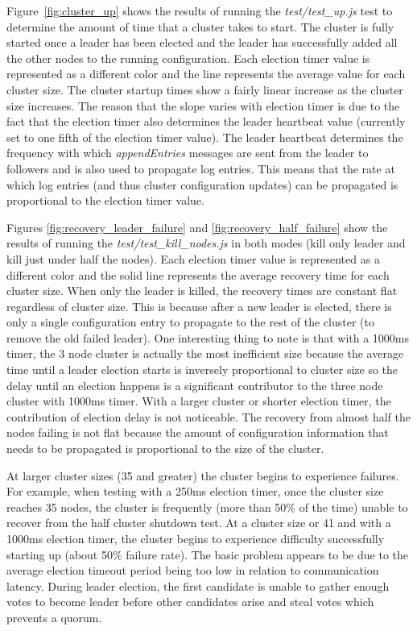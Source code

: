 \documentclass[conference,compsoc]{./IEEEtran/IEEEtran}
\begin{document}
Figure~\ref{fig:cluster_up} shows the results of running the
\emph{test/test\_up.js} test to determine the amount of time that
a cluster takes to start. The cluster is fully started once a leader
has been elected and the leader has successfully added all the other
nodes to the running configuration. Each election timer value is
represented as a different color and the line represents the average
value for each cluster size. The cluster startup times show a fairly
linear increase as the cluster size increases. The reason that the
slope varies with election timer is due to the fact that the election
timer also determines the leader heartbeat value (currently set to one
fifth of the election timer value). The leader heartbeat determines
the frequency with which \emph{appendEntries} messages are sent from
the leader to followers and is also used to propagate log entries.
This means that the rate at which log entries (and thus cluster
configuration updates) can be propagated is proportional to the
election timer value.

Figures \ref{fig:recovery_leader_failure} and
\ref{fig:recovery_half_failure} show the results of running the
\emph{test/test\_kill\_nodes.js} in both modes (kill only leader and
kill just under half the nodes). Each election timer value is
represented as a different color and the solid line represents the
average recovery time for each cluster size. When only the leader is
killed, the recovery times are constant flat regardless of cluster
size. This is because after a new leader is elected, there is only
a single configuration entry to propagate to the rest of the cluster
(to remove the old failed leader). One interesting thing to note is
that with a 1000ms timer, the 3 node cluster is actually the most
inefficient size because the average time until a leader election
starts is inversely proportional to cluster size so the delay until an
election happens is a significant contributor to the three node
cluster with 1000ms timer. With a larger cluster or shorter election
timer, the contribution of election delay is not noticeable. The
recovery from almost half the nodes failing is not flat because the
amount of configuration information that needs to be propagated is
proportional to the size of the cluster.

At larger cluster sizes (35 and greater) the cluster begins to
experience failures. For example, when testing with a 250ms election
timer, once the cluster size reaches 35 nodes, the cluster is
frequently (more than 50\% of the time) unable to recover from the
half cluster shutdown test. At a cluster size or 41 and with a 1000ms
election timer, the cluster begins to experience difficulty
successfully starting up (about 50\% failure rate). The basic problem
appears to be due to the average election timeout period being too low
in relation to communication latency. During leader election, the
first candidate is unable to gather enough votes to become leader
before other candidates arise and steal votes which prevents a quorum.
\end{document}
